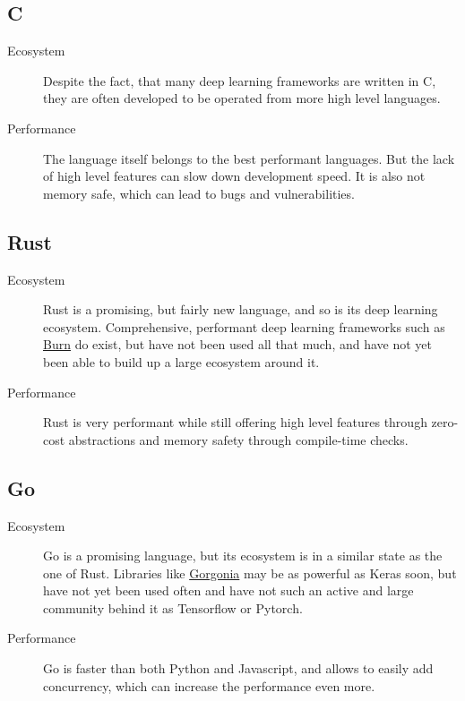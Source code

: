 \documentclass[12pt, a4paper, titlepage]{report}
\begin{document}
{
   \center
   \subsection*{C}
}
\begin{description}
   \item[Ecosystem] Despite the fact, that many deep learning frameworks are written in C, they are often developed to be operated from more high level languages.
   \item[Performance] The language itself belongs to the best performant languages. But the lack of high level features can slow down development speed. It is also not memory safe, which can lead to bugs and vulnerabilities.
\end{description}

{
   \center
   \subsection*{Rust}
}
\begin{description}
   \item[Ecosystem] Rust is a promising, but fairly new language, and so is its deep learning ecosystem. Comprehensive, performant deep learning frameworks such as \href{https://github.com/Tracel-AI/burn}{Burn} do exist, but have not been used all that much, and have not yet been able to build up a large ecosystem around it.
   \item[Performance] Rust is very performant while still offering high level features through zero-cost abstractions and memory safety through compile-time checks.
\end{description}

{
   \center
   \subsection*{Go}
}
\begin{description}
   \item[Ecosystem] Go is a promising language, but its ecosystem is in a similar state as the one of Rust. Libraries like \href{https://github.com/Tracel-AI/gorgonia}{Gorgonia} may be as powerful as Keras soon, but have not yet been used often and have not such an active and large community behind it as Tensorflow or Pytorch.
   \item[Performance] Go is faster than both Python and Javascript, and allows to easily add concurrency, which can increase the performance even more.
\end{description}
\end{document}
